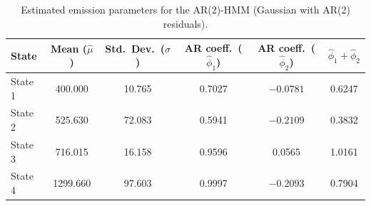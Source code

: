 \begin{table}[ht]
\centering
\begin{tabular}{lccccc}
\hline
State & Mean ($\hat{\mu}$) & Std.\ Dev.\ ($\hat{\sigma}$) & AR coeff.\ ($\hat{\phi}_1$) & AR coeff.\ ($\hat{\phi}_2$) & $\hat{\phi}_1 + \hat{\phi}_2$ \\
\hline
State 1 &  400.000 &   10.765 &  0.7027 & $-0.0781$ &  0.6247 \\
State 2 &  525.630 &   72.083 &  0.5941 & $-0.2109$ &  0.3832 \\
State 3 &  716.015 &   16.158 &  0.9596 &  0.0565 &  1.0161 \\
State 4 & 1299.660 &   97.603 &  0.9997 & $-0.2093$ &  0.7904 \\
\hline
\end{tabular}
\caption{Estimated emission parameters for the AR(2)-HMM (Gaussian with AR(2) residuals).}
\label{tab:ar_2_hmm_emissions}
\end{table}
